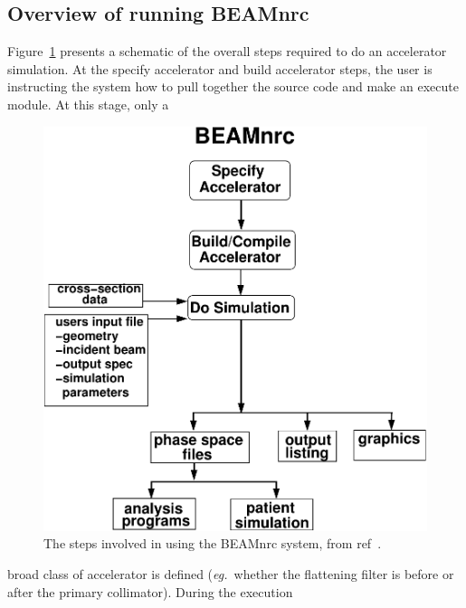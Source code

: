 \documentclass[12pt,twoside]{article}
\newcommand{\eg}{{\em eg.}}
\begin{document}
\clearpage
\subsection{Overview of running BEAMnrc}

Figure~\ref{fig_flow} presents a schematic of the overall steps required
to do an accelerator simulation.  At the {\sf specify} accelerator and {\sf
build} accelerator steps, the user is instructing the system how to pull
together the source code and make an execute module.  At this stage, only a
 
\begin{figure}[htbp]
\begin{center}
\leavevmode
\mbox{}\hspace{0cm}
\includegraphics[width=15cm]{figures/flow}
\caption[Steps involved in using the BEAMnrc code]
{The steps involved in using the BEAMnrc system, from ref~\cite{Ro95}.}
\label{fig_flow}
\end{center}
\end{figure}
broad class of accelerator is defined (\eg\ whether the flattening
filter is before or after the primary collimator).  During the execution
\end{document}
